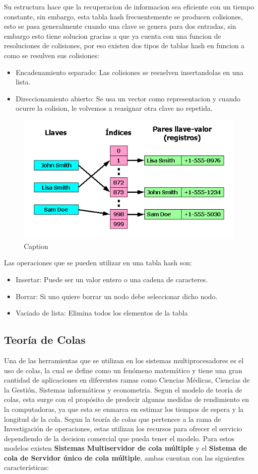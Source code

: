 \documentclass[conference,letterpaper]{IEEEtran}
\begin{document}
Su estructura hace que la recuperacion de informacion sea eficiente con un tiempo constante, sin embargo, esta tabla hash frecuentemente se producen colisiones, esto se pasa generalmente cuando una clave se genera para dos entradas, sin embargo esto tiene solucion gracias a que ya cuenta con una funcion de resoluciones de colisiones, por eso existen dos tipos de tablas hash en funcion a como se resulven sus colisiones:

\begin{itemize}
    \item Encadenamiento separado: Las colisiones se resuelven insertandolas en una lista.
    \item Direccionamiento abierto: Se usa un vector como representacion y cuando ocurre la colision, le volvemos a reasignar otra clave no repetida.
\end{itemize}

\begin{figure}[thpb]
    \centering
    \includegraphics[width=0.55\linewidth]{Tabla_hash1.png}
    \caption{Caption}
    \label{fig:hash}
\end{figure}

Las operaciones que se pueden utilizar en una tabla hash son:
\begin{itemize}
    \item Insertar: Puede ser un valor entero o una cadena de caracteres.
    \item Borrar: Si uno quiere borrar un nodo debe seleccionar dicho nodo.
    \item Vaciado de lista: Elimina todos los elementos de la tabla
\end{itemize}

\subsection{Teor\'ia de Colas}
Una de las herramientas que se utilizan en los sistemas multiprocesadores es el uso de colas, la cual se define como un fen\'omeno matem\'atico y tiene una gran cantidad de aplicaciones en diferentes ramas como Ciencias M\'edicas, Ciencias de la Gesti\'on, Sistemas inform\'aticos y econometria. Segun el modelo de teor\'ia de colas, esta surge con el prop\'osito de predecir algunas medidas de rendimiento en la computadoras, ya que esta se enmarca en estimar los tiempos de espera y la longitud de la cola. Segun la teor\'ia de colas que pertenece a la rama de Investigaci\'on de operaciones, estas utilizan los recursos para ofrecer el servicio dependiendo de la decision comercial que pueda tener el modelo. Para estos modelos existen \textbf{Sistemas Multiservidor de cola m\'ultiple} y el \textbf{Sistema de cola de Servidor \'unico de cola m\'ultiple}, ambas cuentan con las siguientes caracter\'isticas:
\end{document}
